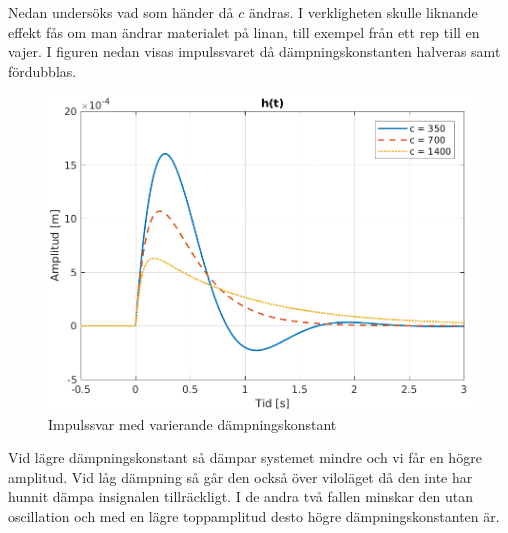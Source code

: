 \newpage
Nedan undersöks vad som händer då $c$ ändras. I verkligheten skulle liknande effekt fås om man ändrar materialet på linan, till exempel från ett rep till en vajer.
I figuren nedan visas impulssvaret då dämpningskonstanten halveras samt fördubblas.
\begin{figure}[H]
    \centering
    \includegraphics[scale=0.9]{bilder/impulssvar_variation_c}
    \caption{Impulssvar med varierande dämpningskonstant}
    \label{fig:impulssvar_variation_c}
\end{figure}
Vid lägre dämpningskonstant så dämpar systemet mindre och vi får en högre amplitud. Vid låg dämpning så går den också över viloläget då den inte har hunnit dämpa insignalen tillräckligt. I de andra två fallen minskar den utan oscillation och med en lägre toppamplitud desto högre dämpningskonstanten är.

\newpage
